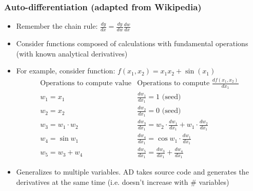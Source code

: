 \documentclass[nofootline]{etk-presentation}
\begin{document}
\begin{frame}[fragile]	\frametitle{Auto-differentiation (adapted from Wikipedia)}
	\begin{itemize}
		\item Remember the chain rule: $\frac{dy}{dx} = \frac{dy}{dw} \frac{dw}{dx}$
		\item Consider functions composed of calculations with fundamental operations (with known analytical derivatives)
		\item For example, consider function: $f(x_1, x_2) = x_1 x_2 + \sin(x_1)$	
	$$
\begin{array}{l|l}
\text{Operations to compute value} &
\text{Operations to compute $\frac{d f(x_1,x_2)}{d x_1}$}
\\
\hline
w_1 = x_1 &
\frac{d w_1}{d x_1} = 1 \text{ (seed)}\\
w_2 = x_2 &
\frac{d  w_2}{d x_1} = 0 \text{ (seed)}
\\
w_3 = w_1 \cdot w_2 &
\frac{d  w_3}{d x_1} = w_2 \cdot \frac{d  w_1}{d x_1} + w_1 \cdot \frac{d  w_2}{d x_1}
\\
w_4 = \sin w_1 &
\frac{d  w_4}{d x_1} = \cos w_1 \cdot \frac{d  w_1}{d x_1}
\\
w_5 = w_3 + w_4 &
\frac{d  w_5}{d x_1} = \frac{d  w_3}{d x_1} + \frac{d  w_4}{d x_1}
\end{array}
$$
\item Generalizes to multiple variables.  AD takes source code and generates the derivatives at the same time (i.e. doesn't increase with \# variables)
	\end{itemize}
\end{frame}
\end{document}
